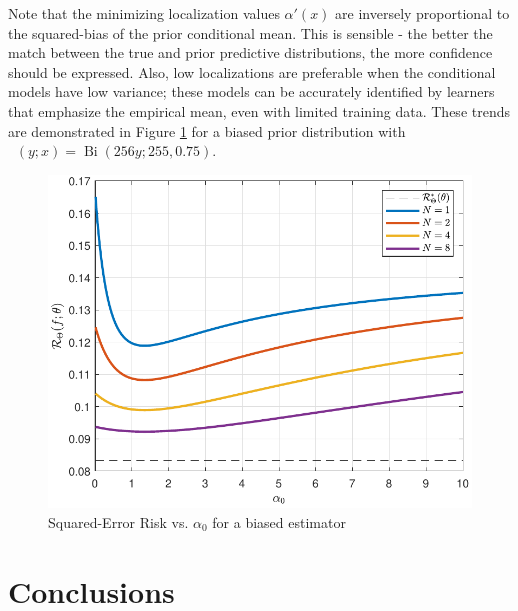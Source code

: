 \documentclass{article}
\DeclareMathOperator{\Bi}{\mathrm{Bi}}
\DeclareMathOperator{\alpham}{\alpha_\text{m}}
\DeclareMathOperator{\alphac}{\alpha_\text{c}}
\begin{document}
Note that the minimizing localization values $\alpha'(x)$ are inversely proportional to the squared-bias of the prior conditional mean. This is sensible - the better the match between the true and prior predictive distributions, the more confidence should be expressed. Also, low localizations are preferable when the conditional models have low variance; these models can be accurately identified by learners that emphasize the empirical mean, even with limited training data. These trends are demonstrated in Figure  \ref{fig:Risk_cond_SE_Dir_a0_leg_N_biased} for a biased prior distribution with $\alphac(y;x) = \Bi(256y;255,0.75)$.
\begin{figure}
	\centering
	\includegraphics[width=0.95\linewidth]{Risk_cond_SE_Dir_a0_leg_N_biased_SSP.pdf}
	\caption{Squared-Error Risk vs. $\alpha_0$ for a biased estimator}
	\label{fig:Risk_cond_SE_Dir_a0_leg_N_biased}
\end{figure}







\section{Conclusions}
\end{document}

